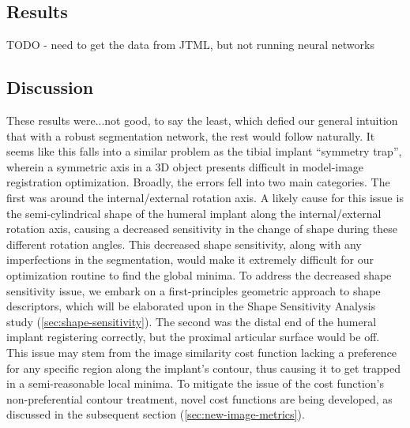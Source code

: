 \subsection{Results}
{\Huge TODO - need to get the data from JTML, but not running neural networks}
\subsection{Discussion}
These results were...not good, to say the least, which defied our general intuition that with a robust segmentation network, the rest would follow naturally.
It seems like this falls into a similar problem as the tibial implant ``symmetry trap'', wherein a symmetric axis in a 3D object presents difficult in model-image registration optimization.
Broadly, the errors fell into two main categories.
The first was around the internal/external rotation axis.
A likely cause for this issue is the semi-cylindrical shape of the humeral implant along the internal/external rotation axis, causing a decreased sensitivity in the change of shape during these different rotation angles.
This decreased shape sensitivity, along with any imperfections in the segmentation, would make it extremely difficult for our optimization routine to find the global minima.
To address the decreased shape sensitivity issue, we embark on a first-principles geometric approach to shape descriptors, which will be elaborated upon in the Shape Sensitivity Analysis study (\cref{sec:shape-sensitivity}).
The second was the distal end of the humeral implant registering correctly, but the proximal articular surface would be off.
This issue may stem from the image similarity cost function lacking a preference for any specific region along the implant's contour, thus causing it to get trapped in a semi-reasonable local minima.
To mitigate the issue of the cost function's non-preferential contour treatment, novel cost functions are being developed, as discussed in the subsequent section (\cref{sec:new-image-metrics}).

